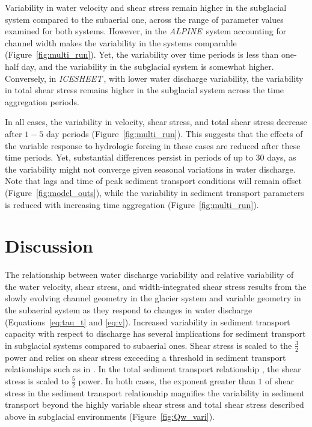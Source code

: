 \documentclass[11pt]{article}
\newcommand{\alpine}{\textit{ALPINE}\,}
\newcommand{\icesheet}{\textit{ICESHEET}\,}
\begin{document}
Variability in water velocity and shear stress remain higher in the subglacial system compared to the subaerial one, across the range of parameter values examined for both systems.
However, in the \alpine{} system accounting for channel width makes the variability in the systems comparable (Figure~\ref{fig:multi_run}).
Yet, the variability over time periods is less than one-half day, and the variability in the subglacial system is somewhat higher. 
Conversely, in \icesheet{}, with lower water discharge variability, the variability in total shear stress remains higher in the subglacial system across the time aggregation periods.

In all cases, the variability in velocity, shear stress, and total shear stress decrease after $1-5$ day periods (Figure~\ref{fig:multi_run}).
This suggests that the effects of the variable response to hydrologic forcing in these cases are reduced after these time periods.
Yet, substantial differences persist in periods of up to $30$ days, as the variability might not converge given seasonal variations in water discharge.
Note that lags and time of peak sediment transport conditions will remain offset (Figure~\ref{fig:model_outs}), while the variability in sediment transport parameters is reduced with increasing time aggregation (Figure~\ref{fig:multi_run}).





\section{Discussion}

The relationship between water discharge variability and relative variability of the water velocity, shear stress, and width-integrated shear stress results from the slowly evolving channel geometry in the glacier system and variable geometry in the subaerial system as they respond to changes in water discharge (Equations~\ref{eq:tau_t} and \ref{eq:v}).
Increased variability in sediment transport capacity with respect to discharge has several implications for sediment transport in subglacial systems compared to subaerial ones.
Shear stress is scaled to the $\frac{3}{2}$ power and relies on shear stress exceeding a threshold in sediment transport relationships  such as in \citet{meyer1948}.
In the total sediment transport relationship \citet{engelund1967}, the shear stress is scaled to $\frac{5}{2}$ power.
In both cases, the exponent greater than $1$ of shear stress in the sediment transport relationship magnifies the variability in sediment transport beyond the highly variable shear stress and total shear stress described above in subglacial environments (Figure~\ref{fig:Qw_vari}).
\end{document}
